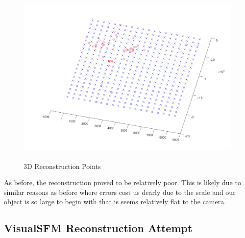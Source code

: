 \documentclass[11pt,psfig]{article}
\begin{document}
\begin{figure}[H]
\centering
\includegraphics[height=3.5in]{sfmResults1/triangulationAttemptSIFT4.png}
\caption{3D Reconstruction Points}
\end{figure}

As before, the reconstruction proved to be relatively poor. This is likely due to similar reasons as before where errors cost us dearly due to the scale and our object is so large to begin with that is seems relatively flat to the camera. 

\newpage

\subsection{VisualSFM Reconstruction Attempt}
\end{document}
